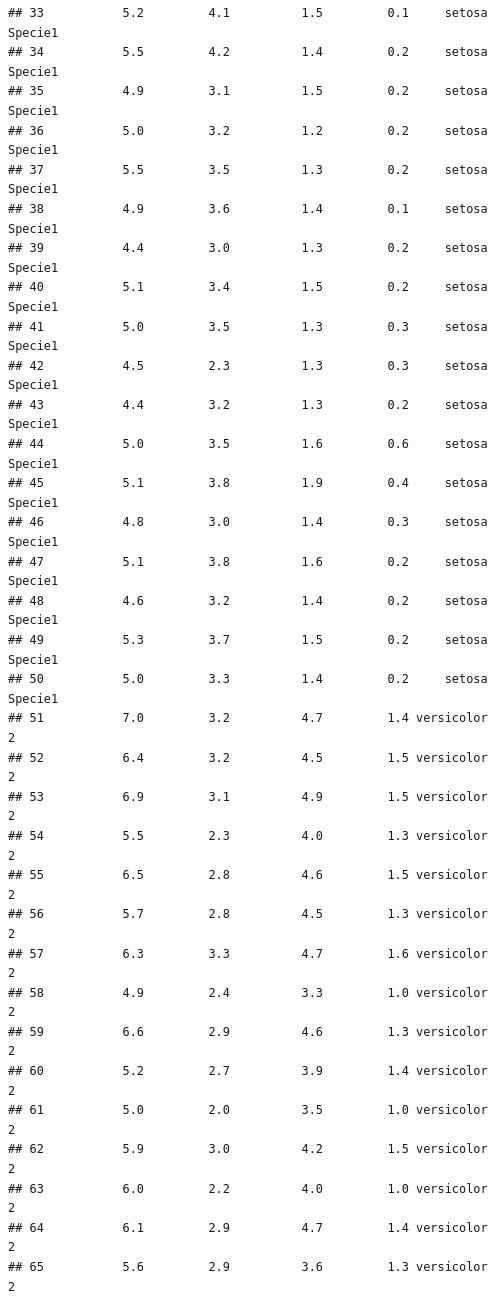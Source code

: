 \documentclass[
]{book}
\begin{document}
\begin{verbatim}
## 33           5.2         4.1          1.5         0.1     setosa    Specie1
## 34           5.5         4.2          1.4         0.2     setosa    Specie1
## 35           4.9         3.1          1.5         0.2     setosa    Specie1
## 36           5.0         3.2          1.2         0.2     setosa    Specie1
## 37           5.5         3.5          1.3         0.2     setosa    Specie1
## 38           4.9         3.6          1.4         0.1     setosa    Specie1
## 39           4.4         3.0          1.3         0.2     setosa    Specie1
## 40           5.1         3.4          1.5         0.2     setosa    Specie1
## 41           5.0         3.5          1.3         0.3     setosa    Specie1
## 42           4.5         2.3          1.3         0.3     setosa    Specie1
## 43           4.4         3.2          1.3         0.2     setosa    Specie1
## 44           5.0         3.5          1.6         0.6     setosa    Specie1
## 45           5.1         3.8          1.9         0.4     setosa    Specie1
## 46           4.8         3.0          1.4         0.3     setosa    Specie1
## 47           5.1         3.8          1.6         0.2     setosa    Specie1
## 48           4.6         3.2          1.4         0.2     setosa    Specie1
## 49           5.3         3.7          1.5         0.2     setosa    Specie1
## 50           5.0         3.3          1.4         0.2     setosa    Specie1
## 51           7.0         3.2          4.7         1.4 versicolor          2
## 52           6.4         3.2          4.5         1.5 versicolor          2
## 53           6.9         3.1          4.9         1.5 versicolor          2
## 54           5.5         2.3          4.0         1.3 versicolor          2
## 55           6.5         2.8          4.6         1.5 versicolor          2
## 56           5.7         2.8          4.5         1.3 versicolor          2
## 57           6.3         3.3          4.7         1.6 versicolor          2
## 58           4.9         2.4          3.3         1.0 versicolor          2
## 59           6.6         2.9          4.6         1.3 versicolor          2
## 60           5.2         2.7          3.9         1.4 versicolor          2
## 61           5.0         2.0          3.5         1.0 versicolor          2
## 62           5.9         3.0          4.2         1.5 versicolor          2
## 63           6.0         2.2          4.0         1.0 versicolor          2
## 64           6.1         2.9          4.7         1.4 versicolor          2
## 65           5.6         2.9          3.6         1.3 versicolor          2

\end{verbatim}
\end{document}
